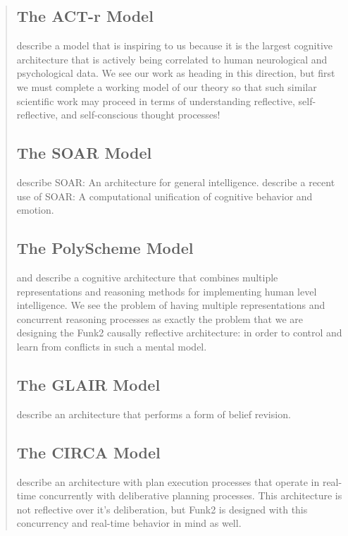\begin{quotation}
\subsection{The ACT-r Model}

\cite{anderson2004itm} describe a model that is inspiring to us because it is the largest cognitive architecture that is actively being correlated to human neurological and psychological data.
We see our work as heading in this direction, but first we must complete a working model of our theory so that such similar scientific work may proceed in terms of understanding reflective, self-reflective, and self-conscious thought processes!

\subsection{The SOAR Model}

\cite{laird1987sag} describe SOAR: An architecture for general intelligence.
\cite{marinier2009cuc} describe a recent use of SOAR: A computational unification of cognitive behavior and emotion.

\subsection{The PolyScheme Model}

\cite{cassimatis2004icp} and \cite{cassimatis2006csa} describe a cognitive architecture that combines multiple representations and reasoning methods for implementing human level intelligence.
We see the problem of having multiple representations and concurrent reasoning processes as exactly the problem that we are designing the Funk2 causally reflective architecture: in order to control and learn from conflicts in such a mental model.

\subsection{The GLAIR Model}

\cite{shapiro2003agl} describe an architecture that performs a form of belief revision.

\subsection{The CIRCA Model}

\cite{musliner2001irt} describe an architecture with plan execution processes that operate in real-time concurrently with deliberative planning processes.
This architecture is not reflective over it's deliberation, but Funk2 is designed with this concurrency and real-time behavior in mind as well.


\end{quotation}

